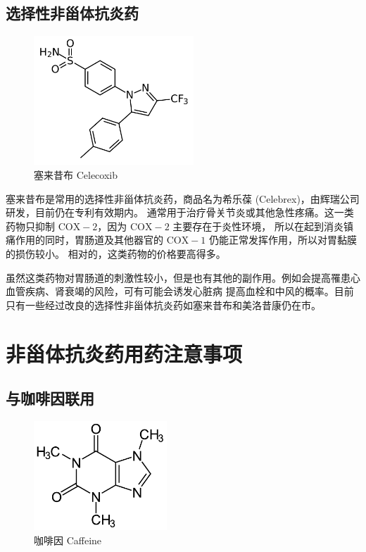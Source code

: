 \documentclass[12pt, a4paper, oneside]{ctexart}
\begin{document}
\subsection{选择性非甾体抗炎药}

\begin{figure}[htbp]
    \centering
    \includegraphics[width=6cm]{Celecoxib.pdf}
    \caption{塞来昔布 Celecoxib}
\end{figure} 

塞来昔布是常用的选择性非甾体抗炎药，商品名为希乐葆 (Celebrex)，由辉瑞公司研发，目前仍在专利有效期内。
通常用于治疗骨关节炎或其他急性疼痛。这一类药物只抑制 $\mathrm{COX-2}$，因为 $\mathrm{COX-2}$ 主要存在于炎性环境，
所以在起到消炎镇痛作用的同时，胃肠道及其他器官的 $\mathrm{COX-1}$ 仍能正常发挥作用，所以对胃黏膜的损伤较小。
相对的，这类药物的价格要高得多。

虽然这类药物对胃肠道的刺激性较小，但是也有其他的副作用。例如会提高罹患心血管疾病\cite{ref3}、肾衰竭的风险，可有可能会诱发心脏病
提高血栓和中风的概率。目前只有一些经过改良的选择性非甾体抗炎药如塞来昔布和美洛昔康仍在市。

\newpage
\section{非甾体抗炎药用药注意事项}
\subsection{与咖啡因联用}

\begin{figure}[htbp]
    \centering
    \includegraphics[width=5cm]{Caffeine.pdf}
    \caption{咖啡因 Caffeine}
\end{figure} 
\end{document}
